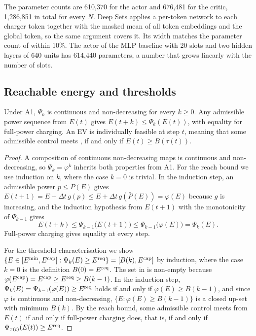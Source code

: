 The parameter counts are 610,370 for the actor and 676,481 for the critic, 1,286,851 in total for every $N$.
Deep Sets applies a per-token network to each charger token together with the masked mean of all token embeddings and the global token, so the same argument covers it.
Its width matches the parameter count of \method{} within 10\%. The actor of the MLP baseline with 20 slots and two hidden layers of 640 units has 614,440 parameters, a number that grows linearly with the number of slots.

\subsection{Reachable energy and thresholds}\label{app:reach}

\begin{lemma}\label{lem:reach}
Under A1, $\Psi_k$ is continuous and non-decreasing for every $k\ge0$.
Any admissible power sequence from $E(t)$ gives $E(t+k)\le\Psi_k(E(t))$, with equality for full-power charging.
An EV is individually feasible at step $t$, meaning that some admissible control meets , if and only if $E(t)\ge B(\tau(t))$.
\end{lemma}

\begin{proof}
A composition of continuous non-decreasing maps is continuous and non-decreasing, so $\Psi_k=\varphi^{k}$ inherits both properties from A1.
For the reach bound we use induction on $k$, where the case $k=0$ is trivial.
In the induction step, an admissible power $p\le\bar P(E)$ gives $E(t+1)=E+\Delta t\,g(p)\le E+\Delta t\,g(\bar P(E))=\varphi(E)$ because $g$ is increasing, and the induction hypothesis from $E(t+1)$ with the monotonicity of $\Psi_{k-1}$ gives
\[
E(t+k)\le\Psi_{k-1}\big(E(t+1)\big)\le\Psi_{k-1}\big(\varphi(E)\big)=\Psi_k(E).
\]
Full-power charging gives equality at every step.

For the threshold characterisation we show $\{E\in[E^{\min},E^{\mathrm{cap}}]:\Psi_k(E)\ge E^{\mathrm{req}}\}=[B(k),E^{\mathrm{cap}}]$ by induction, where the case $k=0$ is the definition $B(0)=E^{\mathrm{req}}$.
The set in  is non-empty because $\varphi(E^{\mathrm{cap}})=E^{\mathrm{cap}}\ge E^{\mathrm{req}}\ge B(k-1)$.
In the induction step, $\Psi_k(E)=\Psi_{k-1}(\varphi(E))\ge E^{\mathrm{req}}$ holds if and only if $\varphi(E)\ge B(k-1)$, and since $\varphi$ is continuous and non-decreasing, $\{E:\varphi(E)\ge B(k-1)\}$ is a closed up-set with minimum $B(k)$.
By the reach bound, some admissible control meets  from $E(t)$ if and only if full-power charging does, that is, if and only if $\Psi_{\tau(t)}(E(t))\ge E^{\mathrm{req}}$.
\end{proof}

